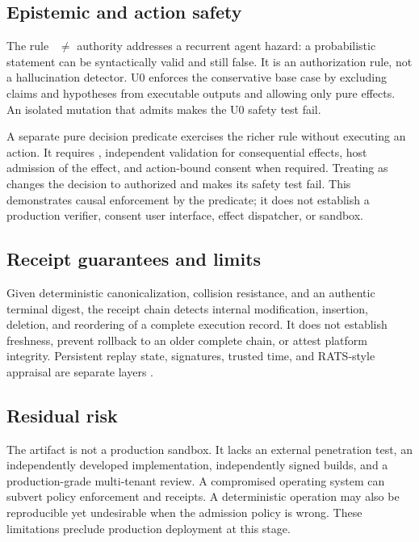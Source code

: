 \subsection{Epistemic and action safety}
The rule \claimkind~$\neq$ authority addresses a recurrent agent hazard: a probabilistic statement can be syntactically valid and still false. It is an authorization rule, not a hallucination detector. U0 enforces the conservative base case by excluding claims and hypotheses from executable outputs and allowing only pure effects. An isolated mutation that admits  makes the U0 safety test fail.

A separate pure decision predicate exercises the richer rule without executing an action. It requires , independent validation for consequential effects, host admission of the effect, and action-bound consent when required. Treating  as  changes the decision to authorized and makes its safety test fail. This demonstrates causal enforcement by the predicate; it does not establish a production verifier, consent user interface, effect dispatcher, or sandbox.

\subsection{Receipt guarantees and limits}
Given deterministic canonicalization, collision resistance, and an authentic terminal digest, the receipt chain detects internal modification, insertion, deletion, and reordering of a complete execution record. It does not establish freshness, prevent rollback to an older complete chain, or attest platform integrity. Persistent replay state, signatures, trusted time, and RATS-style appraisal are separate layers \cite{RFC9334}.

\subsection{Residual risk}
The artifact is not a production sandbox. It lacks an external penetration test, an independently developed implementation, independently signed builds, and a production-grade multi-tenant review. A compromised operating system can subvert policy enforcement and receipts. A deterministic operation may also be reproducible yet undesirable when the admission policy is wrong. These limitations preclude production deployment at this stage.
